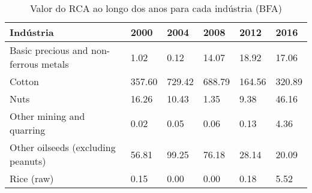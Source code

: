 \begin{table}
\centering
\caption{Valor do RCA ao longo dos anos para cada indústria (BFA)}
\begin{tabular}{p{6cm}p{1.5cm}p{1.5cm}p{1.5cm}p{1.5cm}p{1.5cm}}
\toprule
                            Indústria &   2000 &   2004 &   2008 &   2012 &   2016 \\
\midrule
Basic precious and non-ferrous metals &   1.02 &   0.12 &  14.07 &  18.92 &  17.06 \\
                               Cotton & 357.60 & 729.42 & 688.79 & 164.56 & 320.89 \\
                                 Nuts &  16.26 &  10.43 &   1.35 &   9.38 &  46.16 \\
            Other mining and quarring &   0.02 &   0.05 &   0.06 &   0.13 &   4.36 \\
   Other oilseeds (excluding peanuts) &  56.81 &  99.25 &  76.18 &  28.14 &  20.09 \\
                           Rice (raw) &   0.15 &   0.00 &   0.00 &   0.18 &   5.52 \\
\bottomrule
\end{tabular}
\end{table}
